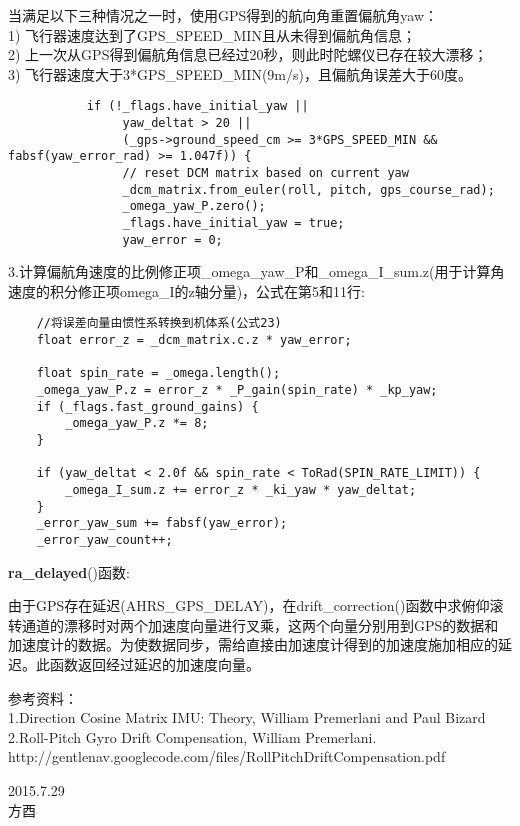 \documentclass[a4paper,10pt]{ctexart} %
\begin{document}
当满足以下三种情况之一时，使用GPS得到的航向角重置偏航角yaw：\\
1) 飞行器速度达到了GPS\_SPEED\_MIN且从未得到偏航角信息；\\
2) 上一次从GPS得到偏航角信息已经过20秒，则此时陀螺仪已存在较大漂移；\\
3) 飞行器速度大于3*GPS\_SPEED\_MIN(9m/s)，且偏航角误差大于60度。
\begin{lstlisting}
           if (!_flags.have_initial_yaw ||
                yaw_deltat > 20 ||
                (_gps->ground_speed_cm >= 3*GPS_SPEED_MIN && fabsf(yaw_error_rad) >= 1.047f)) {
                // reset DCM matrix based on current yaw
                _dcm_matrix.from_euler(roll, pitch, gps_course_rad);
                _omega_yaw_P.zero();
                _flags.have_initial_yaw = true;
                yaw_error = 0;
\end{lstlisting}

3.计算偏航角速度的比例修正项\_omega\_yaw\_P和\_omega\_I\_sum.z(用于计算角速度的积分修正项omega\_I的z轴分量)，公式在第5和11行:
\begin{lstlisting}
    //将误差向量由惯性系转换到机体系(公式23)
    float error_z = _dcm_matrix.c.z * yaw_error;

    float spin_rate = _omega.length();
    _omega_yaw_P.z = error_z * _P_gain(spin_rate) * _kp_yaw;
    if (_flags.fast_ground_gains) {
        _omega_yaw_P.z *= 8;
    }

    if (yaw_deltat < 2.0f && spin_rate < ToRad(SPIN_RATE_LIMIT)) {
        _omega_I_sum.z += error_z * _ki_yaw * yaw_deltat;
    }
    _error_yaw_sum += fabsf(yaw_error);
    _error_yaw_count++;
\end{lstlisting}


\vspace{10pt}
\noindent\textbf{ra\_delayed}()函数:

由于GPS存在延迟(AHRS\_GPS\_DELAY)，在drift\_correction()函数中求俯仰滚转通道的漂移时对两个加速度向量进行叉乘，这两个向量分别用到GPS的数据和加速度计的数据。为使数据同步，需给直接由加速度计得到的加速度施加相应的延迟。此函数返回经过延迟的加速度向量。


\vspace{30pt}
\noindent 参考资料：\\
1.Direction Cosine Matrix IMU: Theory, William Premerlani and Paul Bizard\\
2.Roll-Pitch Gyro Drift Compensation, William Premerlani.\\
http://gentlenav.googlecode.com/files/RollPitchDriftCompensation.pdf


\begin{flushright}
\vspace{30pt}
2015.7.29\\
方酉
\end{flushright}
\end{document}
